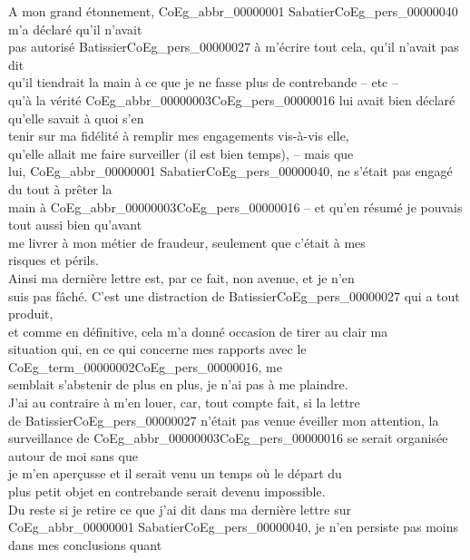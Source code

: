 \documentclass{book}
\begin{document}
\indent A mon grand étonnement, \gls{CoEg_abbr_00000001} Sabatier\gls{CoEg_pers_00000040} m’a déclaré qu’il n’avait\\
pas autorisé Batissier\gls{CoEg_pers_00000027} à m’écrire tout cela, qu’il n’avait pas dit\\
qu’il tiendrait la main à ce que je ne fasse plus de contrebande – etc –\\
qu’à la vérité \gls{CoEg_abbr_00000003}\gls{CoEg_pers_00000016} lui avait bien déclaré qu’elle savait à quoi s’en\\
tenir sur ma fidélité à remplir mes engagements vis-à-vis elle,\\
qu’elle allait me faire surveiller (il est bien temps), – mais que\\
lui, \gls{CoEg_abbr_00000001} Sabatier\gls{CoEg_pers_00000040}, ne s’était pas engagé du tout à prêter la\\
main à \gls{CoEg_abbr_00000003}\gls{CoEg_pers_00000016} – et qu’en résumé je pouvais tout aussi bien qu’avant\\
me livrer à mon métier de fraudeur, seulement que c’était à mes\\
risques et périls.\\
\indent Ainsi ma dernière lettre est, par ce fait, non avenue, et je n’en\\
suis pas fâché. C’est une distraction de Batissier\gls{CoEg_pers_00000027} qui a tout produit,\\
et comme en définitive, cela m’a donné occasion de tirer au clair ma\\
situation qui, en ce qui concerne mes rapports avec le \Gls{CoEg_term_00000002}\gls{CoEg_pers_00000016}, me\\
semblait s’abstenir de plus en plus, je n’ai pas à me plaindre.\\
J’ai au contraire à m’en louer, car, tout compte fait, si la lettre\\
de Batissier\gls{CoEg_pers_00000027} n’était pas venue éveiller mon attention, la\\
surveillance de \gls{CoEg_abbr_00000003}\gls{CoEg_pers_00000016} se serait organisée autour de moi sans que\\
je m’en aperçusse et il serait venu un temps où le départ du\\
plus petit objet en contrebande serait devenu impossible.\\
\indent Du reste si je retire ce que j’ai dit dans ma dernière lettre sur\\
\gls{CoEg_abbr_00000001} Sabatier\gls{CoEg_pers_00000040}, je n’en persiste pas moins dans mes conclusions quant\\
\end{document}
